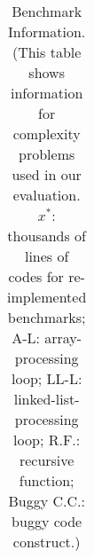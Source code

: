 \begin{table}[h!]
{{\begin{tabular}{lccccccccccc}


    \bottomrule
   \end{tabular}
   }
   }
  \caption{Benchmark Information.
  \footnotesize{(This table shows information for complexity problems used in our evaluation. 
   $x^*$: thousands of lines of codes for re-implemented benchmarks; 
   A-L: array-processing loop; 
   LL-L: linked-list-processing loop; 
   R.F.: recursive function; 
   Buggy C.C.: buggy code construct.)}}
  \label{tab:benchmark_info}
\end{table}